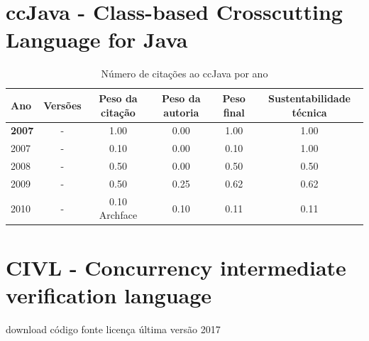 \section{ccJava - Class-based Crosscutting Language for Java}


\begin{table}[H]
\caption{Número de citações ao ccJava  por ano}
\centering
\begin{tabular}{| l | c | c | c | c | c |}
  \hline
  Ano & Versões & Peso da citação & Peso da autoria & Peso final & Sustentabilidade técnica \\
  \hline
            {\bf 2007}
          &
          -
          &
          1.00
          &
          0.00
          &
          1.00
          &
            {\color{blue} 1.00}
          \\
            2007
          &
          -
          &
          0.10
          &
          0.00
          &
          0.10
          &
            {\color{blue} 1.00}
          \\
\hline
            2008
          &
          -
          &
          0.50
          &
          0.00
          &
          0.50
          &
            {\color{blue} 0.50}
          \\
\hline
            2009
          &
          -
          &
          0.50
          &
          0.25
          &
          0.62
          &
            {\color{blue} 0.62}
          \\
\hline
            2010
          &
          -
          &
          0.10
            {\tiny Archface}
          &
          0.10
          &
          0.11
          &
            {\color{red} 0.11}
          \\
\hline
\end{tabular}
\end{table}



\section{CIVL - Concurrency intermediate verification language}
\checkmark download
\checkmark código fonte
\checkmark licença
\checkmark última versão 2017


